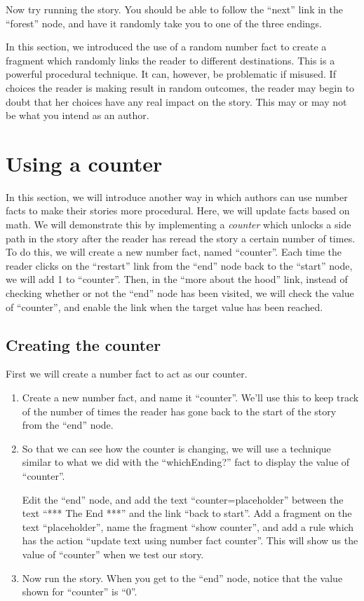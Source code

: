 \documentclass{article}
\begin{document}
\noindent Now try running the story. You should be able to follow the ``next'' link in the ``forest'' node, and have it randomly take you to one of the three endings.

In this section, we introduced the use of a random number fact to create a fragment which randomly links the reader to different destinations. This is a powerful procedural technique. It can, however, be problematic if misused. If choices the reader is making result in random outcomes, the reader may begin to doubt that her choices have any real impact on the story. This may or may not be what you intend as an author.

\section{Using a counter}

In this section, we will introduce another way in which authors can 
use number facts to make their stories more procedural. Here, we will 
update facts based on math. We will demonstrate this by implementing 
a \textit{counter} which unlocks a side path in the story after the 
reader has reread the story a certain number of times. To do this, we 
will create a new number fact, named ``counter''. Each time the 
reader clicks on the ``restart'' link from the ``end'' node back to 
the ``start'' node, we will add 1 to ``counter''. Then, in the ``more 
about the hood'' link, instead of checking whether or not the ``end'' 
node has been visited, we will check the value of ``counter'', and 
enable the link when the target value has been reached.

\subsection{Creating the counter}

First we will create a number fact to act as our counter.

\begin{enumerate}
    \item Create a new number fact, and name it ``counter''. We'll 
    use this to keep track of the number of times the reader has gone 
    back to the start of the story from the ``end'' node.
    \item So that we can see how the counter is changing, we will use 
    a technique similar to what we did with the ``whichEnding?'' fact 
    to display the value of ``counter''.
    
    Edit the ``end'' node, and add the text ``counter=placeholder'' 
    between the text ``*** The End ***'' and the link ``back to 
    start''. Add a fragment on the text ``placeholder'', name the fragment 
    ``show counter'', and add a rule which has the action ``update 
    text using number fact counter''. This will show us the value of 
    ``counter'' when we test our story.
\item Now run the story. When you get to the ``end'' node, notice that the 
value shown for ``counter'' is ``0''. 
\end{enumerate}
\end{document}
